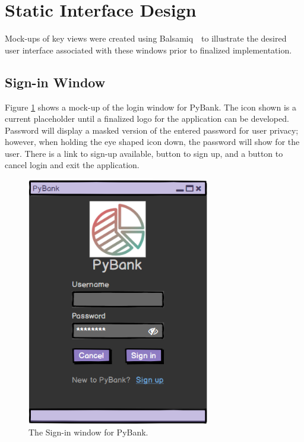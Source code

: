 \section{Static Interface Design}
\label{sect:static_interface_design}

Mock-ups of key views were created using Balsamiq~\cite{BALSAMIQ_MOCKUPS_3:1}~to illustrate the desired user interface associated with these windows prior to finalized implementation.

\subsection{Sign-in Window}
\label{sect:signin_window}

Figure \ref{fig:signin} shows a mock-up of the login window for PyBank. The icon shown is a current placeholder until a finalized logo for the application can be developed. Password will display a masked version of the entered password for user privacy; however, when holding the eye shaped icon down, the password will show for the user. There is a link to sign-up available, button to sign up, and a button to cancel login and exit the application.

\FloatBarrier
\begin{figure}[!ht]
    \centering
    \includegraphics[width=8cm]{figures/signin.png}
    \caption{The Sign-in window for PyBank.}
    \label{fig:signin}
\end{figure}

\newpage

